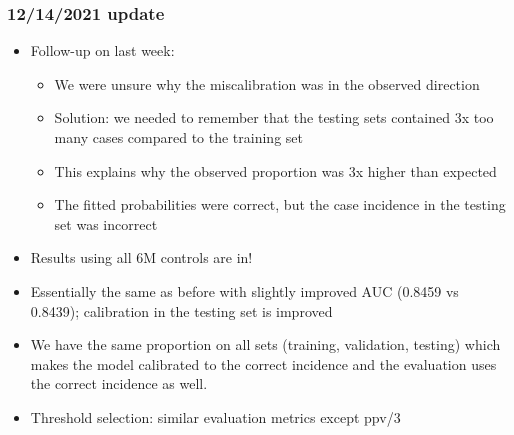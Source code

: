 \documentclass[12pt]{article}
\begin{document}
\pagebreak
\subsubsection*{12/14/2021 update}

\begin{itemize}
	\item Follow-up on last week: 
	\begin{itemize}
		\item We were unsure why the miscalibration was in the observed direction
		\item Solution: we needed to remember that the testing sets
		contained 3x too many cases compared to the training set
		\item This explains why the observed proportion was 3x higher than expected
		\item The fitted probabilities were correct, but the case incidence in the testing set was incorrect
	\end{itemize}
	\item Results using all 6M controls are in!
	\item Essentially the same as before with slightly improved AUC (0.8459 vs 0.8439); calibration in the testing set is improved
	\item We have the same proportion on all sets (training, validation, testing) which makes the model calibrated to the correct incidence and the
	evaluation uses the correct incidence as well.
	\item Threshold selection: similar evaluation metrics except ppv/3
\end{itemize}
\end{document}
